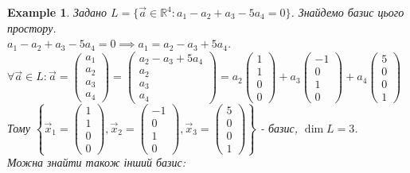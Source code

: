\documentclass[a4paper, 10pt]{article}
\theoremstyle{theoremdd}
\newtheorem{example}[theorem]{Example}
\begin{document}
	\begin{example}
	Задано $L = \{\vec{a} \in \mathbb{R}^4: a_1 - a_2 + a_3 - 5a_4 = 0\}$. Знайдемо базис цього простору.\\
	$a_1 - a_2 + a_3 - 5a_4 = 0 \implies a_1 = a_2 - a_3 + 5a_4$.\\
	$\forall \vec{a} \in L: \vec{a} = \begin{pmatrix} a_1 \\ a_2 \\ a_3 \\ a_4 \end{pmatrix} = \begin{pmatrix} a_2 - a_3 + 5a_4 \\ a_2 \\ a_3 \\ a_4 \end{pmatrix} = a_2 \begin{pmatrix} 1 \\ 1 \\ 0 \\ 0\end{pmatrix} + a_3 \begin{pmatrix} -1 \\ 0 \\ 1 \\ 0\end{pmatrix} + a_4 \begin{pmatrix} 5 \\ 0 \\ 0 \\ 1 \end{pmatrix}$\\
	Тому $\left\{\vec{x}_1 = \begin{pmatrix} 1 \\ 1 \\ 0 \\ 0\end{pmatrix}, \vec{x}_2 = \begin{pmatrix} -1 \\ 0 \\ 1 \\ 0\end{pmatrix}, \vec{x}_3 = \begin{pmatrix} 5 \\ 0 \\ 0 \\ 1\end{pmatrix} \right\}$ - базис, $\dim{L} = 3$.
	\bigskip \\
	Можна знайти також інший базис:\\

\end{example}
\end{document}
